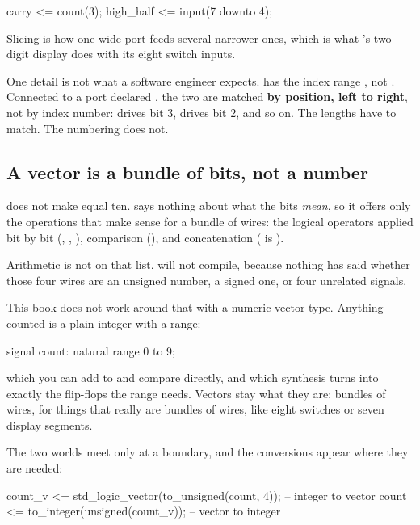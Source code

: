 \begin{vhdlcode}
carry     <= count(3);
high_half <= input(7 downto 4);
\end{vhdlcode}

\noindent Slicing is how one wide port feeds several narrower ones, which is what 's
two-digit display does with its eight switch inputs.

One detail is not what a software engineer expects.  has the index range
, not . Connected to a port declared
, the two are matched \textbf{by position, left to right}, not by
index number:  drives bit 3,  drives bit 2, and so on. The lengths
have to match. The numbering does not.

\subsection{A vector is a bundle of bits, not a number}
\label{c2:bundle}
 does not make  equal ten.  says nothing
about what the bits \emph{mean}, so it offers only the operations that make sense for a bundle of
wires: the logical operators applied bit by bit (, , ),
comparison (), and concatenation ( is ).

Arithmetic is not on that list.  will not compile, because nothing has said whether
those four wires are an unsigned number, a signed one, or four unrelated signals.

This book does not work around that with a numeric vector type. Anything counted is a plain integer
with a range:

\begin{vhdlcode}
signal count: natural range 0 to 9;
\end{vhdlcode}

\noindent which you can add to and compare directly, and which synthesis turns into exactly the
flip-flops the range needs. Vectors stay what they are: bundles of wires, for things that really are
bundles of wires, like eight switches or seven display segments.

The two worlds meet only at a boundary, and the conversions appear where they are needed:

\begin{vhdlcode}
count_v <= std_logic_vector(to_unsigned(count, 4));   -- integer to vector
count   <= to_integer(unsigned(count_v));             -- vector to integer
\end{vhdlcode}


